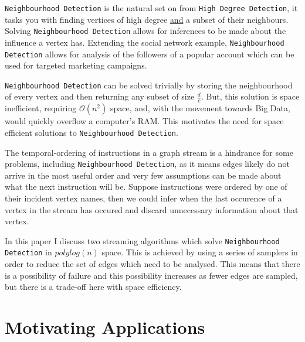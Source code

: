 \documentclass[11pt,twoside,a4paper]{report}
\begin{document}
\par\texttt{Neighbourhood Detection} is the natural set on from \texttt{High Degree Detection}, it tasks you with finding vertices of high degree \underline{and} a subset of their neighbours. Solving \texttt{Neighbourhood Detection} allows for inferences to be made about the influence a vertex has. Extending the social network example, \texttt{Neighbourhood Detection} allows for analysis of the followers of a popular account which can be used for targeted marketing campaigns.

\par\texttt{Neighbourhood Detection} can be solved trivially by storing the neighbourhood of every vertex and then returning any subset of size $\frac{d}c$. But, this solution is space inefficient, requiring $\mathcal{O}(n^2)$ space, and, with the movement towards Big Data, would quickly overflow a computer's RAM. This motivates the need for space efficient solutions to \texttt{Neighbourhood Detection}.

\par The temporal-ordering of instructions in a graph stream is a hindrance for some problems, including \texttt{Neighbourhood Detection}, as it means edges likely do not arrive in the most useful order and very few assumptions can be made about what the next instruction will be. Suppose instructions were ordered by one of their incident vertex names, then we could infer when the last occurence of a vertex in the stream has occured and discard unnecessary information about that vertex.

\par In this paper I discuss two streaming algorithms which solve \texttt{Neighbourhood Detection} in $polylog(n)$ space. This is achieved by using a series of samplers in order to reduce the set of edges which need to be analysed. This means that there is a possibility of failure and this possibility increases as fewer edges are sampled, but there is a trade-off here with space efficiency.

\section{Motivating Applications} %
\end{document}
